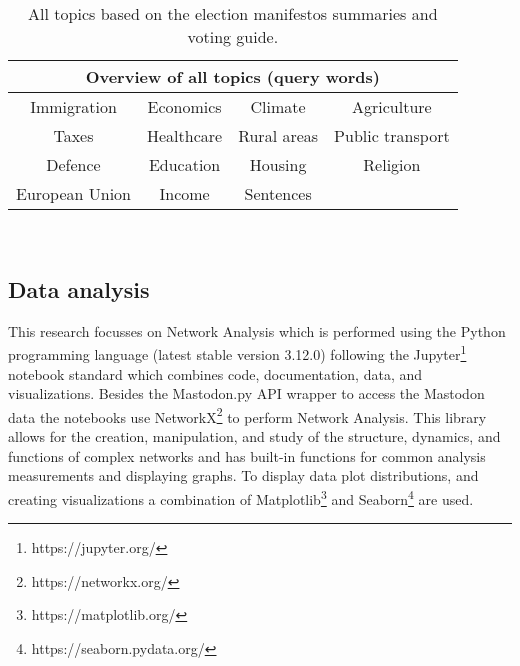 \begin{table}
\begin{center}
\begin{tabular}{||c c c c||} 
 \hline
 \multicolumn{4}{|c|}{\textbf{Overview of all topics (query words)}} \\
 \hline
 Immigration & Economics & Climate & Agriculture \\
 \hline
 Taxes & Healthcare & Rural areas & Public transport \\
 \hline
 Defence & Education & Housing & Religion \\
 \hline
 European Union & Income & Sentences &  \\
 \hline
 
\end{tabular}
\\
\caption{\label{topic-table}All topics based on the election manifestos summaries and voting guide.}
\end{center}
\end{table}

\subsection{Data analysis}

This research focusses on Network Analysis which is performed using the Python programming language (latest stable version 3.12.0) following the Jupyter\footnote{https://jupyter.org/} notebook standard which combines code, documentation, data, and visualizations. Besides the Mastodon.py API wrapper to access the Mastodon data the notebooks use NetworkX\footnote{https://networkx.org/} to perform Network Analysis.
This library allows for the creation, manipulation, and study of the structure, dynamics, and functions of complex networks and has built-in functions for common analysis measurements and displaying graphs. To display data  plot distributions, and creating visualizations a combination of Matplotlib\footnote{https://matplotlib.org/} and Seaborn\footnote{https://seaborn.pydata.org/} are used.